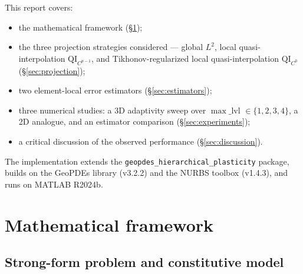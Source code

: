 \documentclass[11pt,a4paper]{article}
\begin{document}
This report covers:
\begin{itemize}[leftmargin=2em]
    \item the mathematical framework
    (\S\ref{sec:framework});
    \item the three projection strategies considered
    --- global $L^2$, local quasi-interpolation $\mathrm{QI}_{C^{p-1}}$,
    and Tikhonov-regularized local quasi-interpolation $\mathrm{QI}_{C^0}$
    (\S\ref{sec:projection});
    \item two element-local error estimators
    (\S\ref{sec:estimators});
    \item three numerical studies: a 3D adaptivity sweep over $\max\_$lvl
    $\in \{1,2,3,4\}$, a 2D analogue, and an estimator comparison
    (\S\ref{sec:experiments});
    \item a critical discussion of the observed performance
    (\S\ref{sec:discussion}).
\end{itemize}

The implementation extends the \texttt{geopdes\_hierarchical\_plasticity}
package, builds on the GeoPDEs library (v3.2.2) and the NURBS toolbox
(v1.4.3), and runs on MATLAB R2024b.

\section{Mathematical framework}\label{sec:framework}

\subsection{Strong-form problem and constitutive model}
\end{document}
